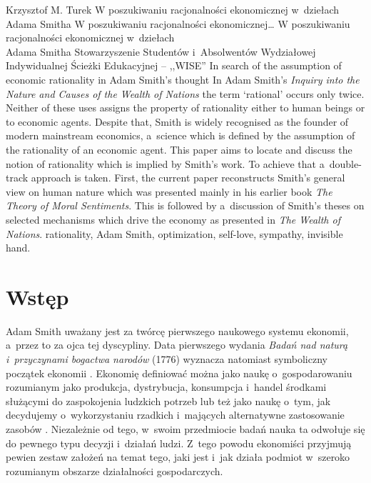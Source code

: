 \begin{artplenv}{Krzysztof M. Turek}
	{W poszukiwaniu racjonalności ekonomicznej w~dziełach Adama Smitha}
	{W poszukiwaniu racjonalności ekonomicznej\ldots}
	{W poszukiwaniu racjonalności ekonomicznej w~dziełach\\Adama Smitha}
	{Stowarzyszenie Studentów i~Absolwentów Wydziałowej Indywidualnej Ścieżki Edukacyjnej -- ,,WISE''\label{turek-start}}
	{In search of the assumption of economic rationality in Adam Smith’s thought}
	{In Adam Smith's \textit{Inquiry into the Nature and Causes of the Wealth of Nations} the term `rational' occurs only twice. Neither of these uses assigns the property of rationality either to human beings or to economic agents. Despite that, Smith is widely recognised as the founder of modern mainstream economics, a~science which is defined by the assumption of the rationality of an economic agent. This paper aims to locate and discuss the notion of rationality which is implied by Smith's work. To achieve that a~double-track approach is taken. First, the current paper reconstructs Smith's general view on human nature which was presented mainly in his earlier book \textit{The Theory of Moral Sentiments}. This is followed by a~discussion of Smith's theses on selected mechanisms which drive the economy as presented in \textit{The Wealth of Nations}.}
	{rationality, Adam Smith, optimization, self-love, sympathy, invisible hand.}
	


\section*{Wstęp}

Adam Smith uważany jest za twórcę pierwszego naukowego systemu ekonomii, a~przez to za ojca tej dyscypliny. Data
pierwszego wydania \textit{Badań nad naturą i~przyczynami bogactwa narodów} (1776) wyznacza natomiast symboliczny
początek ekonomii
\parencite[s.~25]{samuelson_ekonomia_2000}.
Ekonomię definiować można jako
naukę o~gospodarowaniu
\parencite[s.~17]{milewski_elementarne_2003}
rozumianym jako produkcja, dystrybucja,
konsumpcja i~handel środkami służącymi do zaspokojenia ludzkich potrzeb lub też jako naukę o~tym, jak decydujemy o~wykorzystaniu
rzadkich i~mających alternatywne zastosowanie zasobów
\parencite{black_slownik_2008,samuelson_ekonomia_2000}.
Niezależnie od tego, w~swoim przedmiocie badań nauka ta odwołuje się do pewnego typu decyzji i~działań
ludzi. Z~tego powodu ekonomiści przyjmują pewien zestaw założeń na temat tego, jaki jest i~jak działa podmiot w~szeroko
rozumianym obszarze działalności gospodarczych.


\end{artplenv}
